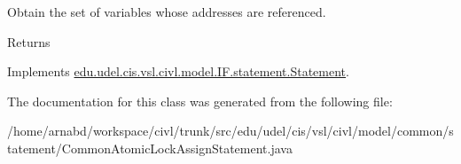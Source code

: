 Obtain the set of variables whose addresses are referenced. 

\begin{DoxyReturn}{Returns}

\end{DoxyReturn}


Implements \hyperlink{interfaceedu_1_1udel_1_1cis_1_1vsl_1_1civl_1_1model_1_1IF_1_1statement_1_1Statement_abe668e1bcb4297c9e6e7f8f65aeecfc2}{edu.\+udel.\+cis.\+vsl.\+civl.\+model.\+I\+F.\+statement.\+Statement}.



The documentation for this class was generated from the following file\+:\begin{DoxyCompactItemize}
\item 
/home/arnabd/workspace/civl/trunk/src/edu/udel/cis/vsl/civl/model/common/statement/Common\+Atomic\+Lock\+Assign\+Statement.\+java\end{DoxyCompactItemize}
